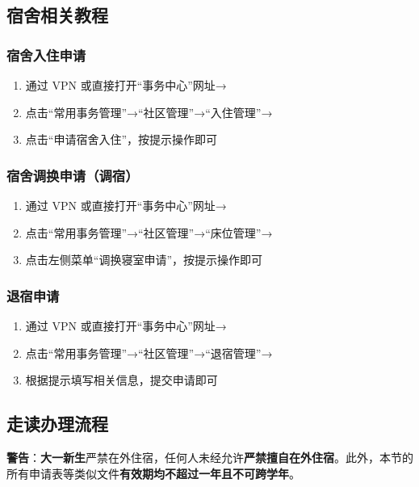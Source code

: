 \subsection[宿舍相关教程]{宿舍相关教程}
\label{dormitory_tutorials}
\subsubsection[宿舍入住申请]{宿舍入住申请}
\label{dormitory_application}
\begin{enumerate}
    \item 通过 VPN 或直接打开“事务中心”网址→
    \item 点击“常用事务管理”→“社区管理”→“入住管理”→
    \item 点击“申请宿舍入住”，按提示操作即可\footnotemark
\end{enumerate}

\subsubsection[宿舍调换申请（调宿）]{宿舍调换申请（调宿）}
\label{dormitory_change}
\begin{enumerate}
    \item 通过 VPN 或直接打开“事务中心”网址→
    \item 点击“常用事务管理”→“社区管理”→“床位管理”→
    \item 点击左侧菜单“调换寝室申请”，按提示操作即可
\end{enumerate}

\subsubsection[退宿申请]{退宿申请}
\label{dormitory_quit}
\begin{enumerate}
    \item 通过 VPN 或直接打开“事务中心”网址→
    \item 点击“常用事务管理”→“社区管理”→“退宿管理”→
    \item 根据提示填写相关信息，提交申请即可
\end{enumerate}

\subsection[走读办理流程]{走读办理流程\footnotemark}
\label{commuter_tutorial}
\textbf{警告}：\textbf{大一新生}严禁在外住宿，任何人未经允许\textbf{严禁擅自在外住宿}。此外，本节的所有申请表等类似文件\textbf{有效期均不超过一年且不可跨学年}。

